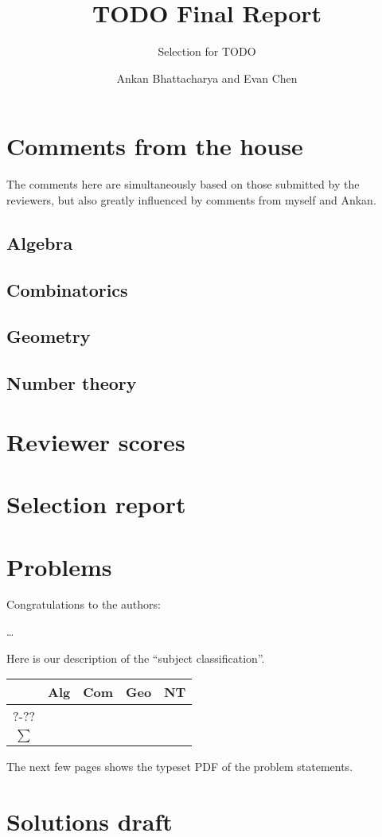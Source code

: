 \documentclass[11pt]{scrreprt}
\begin{document}
\title{TODO Final Report}
\subtitle{Selection for TODO}
\author{Ankan Bhattacharya and Evan Chen}
\maketitle

\tableofcontents

\chapter{Comments from the house}
The comments here are simultaneously
based on those submitted by the reviewers,
but also greatly influenced by comments from myself and Ankan.

\section{Algebra}
\section{Combinatorics}
\section{Geometry}
\section{Number theory}
\chapter{Reviewer scores}
\setlength\tabcolsep{5pt}


\chapter{Selection report}
\chapter{Problems}
Congratulations to the authors:
\begin{description}
	\ii[\dots] \dots
\end{description}

Here is our description of the ``subject classification''.


\begin{center}
	\begin{tabular}[h]{c rrrr}
		\toprule
		& Alg & Com & Geo & NT \\
		\midrule
		?-?? &      &      &      &      \\
		\midrule
		$\sum$  &      &      &      &      \\
		\bottomrule
	\end{tabular}
\end{center}

The next few pages
shows the typeset PDF of the problem statements.

% 
% 

\chapter{Solutions draft}
\end{document}
